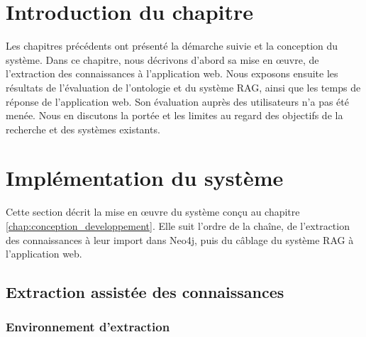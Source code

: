 

\section*{Introduction du chapitre}

Les chapitres précédents ont présenté la démarche suivie et la conception du système. Dans ce chapitre, nous décrivons d'abord sa mise en œuvre, de l'extraction des connaissances à l'application web. Nous exposons ensuite les résultats de l'évaluation de l'ontologie et du système RAG, ainsi que les temps de réponse de l'application web. Son évaluation auprès des utilisateurs n'a pas été menée. Nous en discutons la portée et les limites au regard des objectifs de la recherche et des systèmes existants.


\section{Implémentation du système}
\label{sec:implementation}

Cette section décrit la mise en œuvre du système conçu au chapitre \ref{chap:conception_developpement}. Elle suit l'ordre de la chaîne, de l'extraction des connaissances à leur import dans Neo4j, puis du câblage du système RAG à l'application web.

\subsection{Extraction assistée des connaissances}
\label{subsec:extraction_llm}

\subsubsection{Environnement d'extraction}

